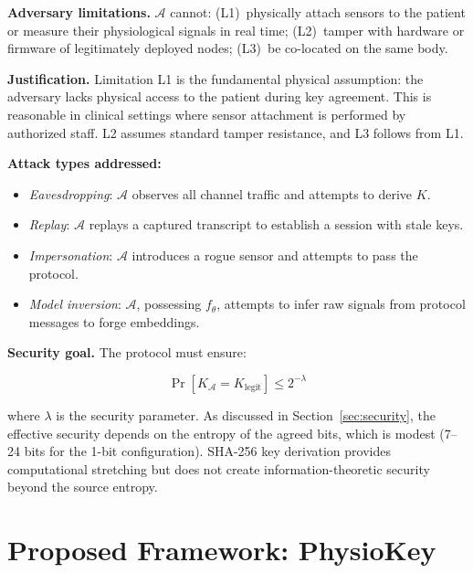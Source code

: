 \documentclass[sensors,article,submit,pdftex,moreauthors]{Definitions/mdpi}
\begin{document}
\textbf{Adversary limitations.} $\mathcal{A}$ cannot: (L1)~physically attach sensors to the patient or measure their physiological signals in real time; (L2)~tamper with hardware or firmware of legitimately deployed nodes; (L3)~be co-located on the same body.

\textbf{Justification.} Limitation L1 is the fundamental physical assumption: the adversary lacks physical access to the patient during key agreement. This is reasonable in clinical settings where sensor attachment is performed by authorized staff. L2 assumes standard tamper resistance, and L3 follows from L1.

\textbf{Attack types addressed:}
\begin{itemize}
    \item \textit{Eavesdropping}: $\mathcal{A}$ observes all channel traffic and attempts to derive $K$.
    \item \textit{Replay}: $\mathcal{A}$ replays a captured transcript to establish a session with stale keys.
    \item \textit{Impersonation}: $\mathcal{A}$ introduces a rogue sensor and attempts to pass the protocol.
    \item \textit{Model inversion}: $\mathcal{A}$, possessing $f_\theta$, attempts to infer raw signals from protocol messages to forge embeddings.
\end{itemize}

\textbf{Security goal.} The protocol must ensure:

\begin{equation}
\label{eq:security_goal}
\Pr[K_{\mathcal{A}} = K_{\text{legit}}] \leq 2^{-\lambda}
\end{equation}

where $\lambda$ is the security parameter. As discussed in Section~\ref{sec:security}, the effective security depends on the entropy of the agreed bits, which is modest (7--24 bits for the 1-bit configuration). SHA-256 key derivation provides computational stretching but does not create information-theoretic security beyond the source entropy.


\section{Proposed Framework: PhysioKey}
\label{sec:framework}
\end{document}
